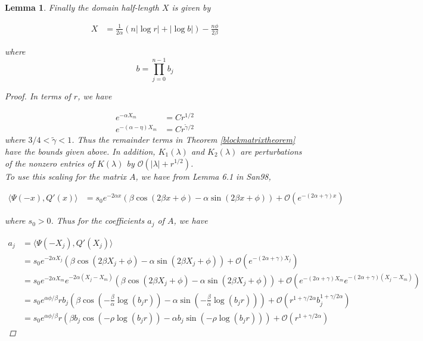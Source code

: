 \documentclass[12pt]{article}
\newtheorem{lemma}{Lemma}
\begin{document}
\begin{lemma}
Finally the domain half-length $X$ is given by

\begin{align}\label{Xscaled}
X &= \frac{1}{2\alpha} (n |\log r| + |\log b| ) - \frac{n \phi}{2 \beta}
\end{align}

where 
\begin{equation}\label{defb}
b = \prod_{j=0}^{n-1} b_j
\end{equation}

\begin{proof}
In terms of $r$, we have

\begin{align*}
e^{-\alpha X_m} &= C r^{1/2} \\
e^{-(\alpha - \eta) X_m} &= C r^{\tilde{\gamma}/2}
\end{align*}
where $3/4 < \tilde{\gamma} < 1$. Thus the remainder terms in Theorem \ref{blockmatrixtheorem} have the bounds given above. In addition, $K_1(\lambda)$ and $K_2(\lambda)$ are perturbations of the nonzero entries of $K(\lambda)$ by $\mathcal{O}(|\lambda| + r^{1/2})$.\\

To use this scaling for the matrix $A$, we have from Lemma 6.1 in San98,

\begin{align}
\langle \Psi(-x), Q'(x) \rangle
&= s_0 e^{-2 \alpha x}\left( \beta \cos(2 \beta x + \phi) - \alpha \sin(2 \beta x + \phi)\right) + \mathcal{O}(e^{-(2 \alpha + \gamma) x}) \label{IPpsiQprime}
\end{align}

where $s_0 > 0$. Thus for the coefficients $a_j$ of $A$, we have

\begin{align*}
a_j &= \langle \Psi(-X_j), Q'(X_j) \rangle \\
&= s_0 e^{-2 \alpha X_j}\left( \beta \cos(2 \beta X_j + \phi) - \alpha \sin(2 \beta X_j + \phi)\right) + \mathcal{O}(e^{-(2 \alpha + \gamma) X_j}) \\
&= s_0 e^{-2 \alpha X_m} e^{-2 \alpha (X_j - X_m)} \left( \beta \cos(2 \beta X_j + \phi) - \alpha \sin(2 \beta X_j + \phi)\right) + \mathcal{O}(e^{-(2 \alpha + \gamma) X_m} e^{-(2 \alpha + \gamma) (X_j - X_m) }) \\
&= s_0 e^{\alpha \phi/\beta} r b_j \left( \beta \cos\left( -\frac{\beta}{\alpha} \log(b_j r) \right) - \alpha \sin \left( -\frac{\beta}{\alpha} \log(b_j r) \right) \right) + \mathcal{O}(r^{1+\gamma/2\alpha} b_j^{1 + \gamma/2\alpha}) \\
&= s_0 e^{\alpha \phi/\beta} r \left( \beta b_j \cos\left( -\rho \log(b_j r) \right) - \alpha b_j \sin \left( -\rho \log(b_j r) \right) \right) + \mathcal{O}(r^{1+\gamma/2\alpha})
\end{align*}


\end{proof}
\end{lemma}
\end{document}

